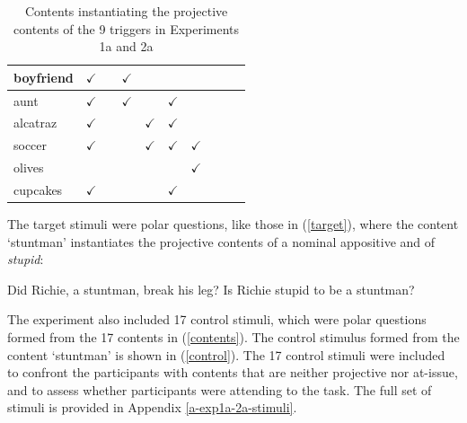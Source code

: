 \documentclass[11pt,fleqn]{article}
\newcommand{\6}{\mbox{$[\hspace*{-.6mm}[$}}
\newcommand{\9}{\mbox{$]\hspace*{-.6mm}]$}}
\begin{document}
\begin{table}[!h]
\begin{center}
\begin{tabular}{l|ccccccccc}
boyfriend & $\checkmark$ & & $\checkmark$ & & & & & &  \\

\hline

aunt & $\checkmark$ & & $\checkmark$ & & $\checkmark$ & & & &  \\

\hline

alcatraz & $\checkmark$ & & & $\checkmark$ & $\checkmark$ & & & &  \\

\hline

soccer & $\checkmark$ & & & $\checkmark$ & $\checkmark$ & $\checkmark$ & & &  \\

\hline

olives & & & & & & $\checkmark$ & & &  \\

\hline

cupcakes & $\checkmark$ & & & & $\checkmark$ & & & &  \\

\hline

\end{tabular}
\end{center}
\caption{Contents instantiating the projective contents of the 9 triggers in Experiments 1a and 2a}\label{t-trigger-content-pairs}
\end{table}

The target stimuli were polar questions, like those in (\ref{target}), where the content `stuntman' instantiates the projective contents of a nominal appositive and of {\em stupid}:

\begin{exe}
\ex\label{target}
\begin{xlist}
\ex Did Richie, a stuntman, break his leg?
\ex Is Richie stupid to be a stuntman?
\end{xlist}
\end{exe}

The experiment also included 17 control stimuli, which were polar questions formed from the 17 contents in (\ref{contents}). The control stimulus formed from the content `stuntman' is shown in (\ref{control}). The 17 control stimuli were included to confront the participants with contents that are neither projective nor at-issue, and to assess whether participants were attending to the task. The full set of stimuli is provided in Appendix \ref{a-exp1a-2a-stimuli}.
\end{document}
